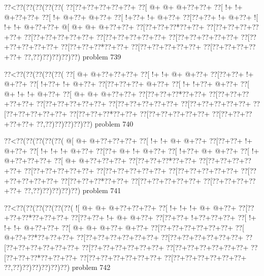 \vbox{\vbox{\goo
\0??<\0??(\0??(\0??(\0??(\0??(
\0??[\0??+\0??+\0??+\0??+\0??+
\0??[\- @+\- @+\- @+\0??+\0??+
\0??[\- !+\- !+\- @+\0??+\0??+
\0??[\- !+\- @+\0??+\- @+\0??+
\0??[\- !+\0??+\- !+\- @+\0??+
\0??[\0??+\0??+\- !+\- @+\0??+
\- ![\- !+\- !+\- @+\0??+\0??+
\- @[\- @+\- @+\- @+\0??+\0??+
\0??[\0??+\0??+\0??*\0??+\0??+
\0??[\0??+\0??+\0??+\0??+\0??+
\0??[\0??+\0??+\0??+\0??+\0??+
\0??[\0??+\0??+\0??+\0??+\0??+
\0??[\0??+\0??+\0??+\0??+\0??+
\0??[\0??+\0??+\0??+\0??+\0??+
\0??[\0??+\0??+\0??*\0??+\0??+
\0??[\0??+\0??+\0??+\0??+\0??+
\0??[\0??+\0??+\0??+\0??+\0??+
\0??,\0??)\0??)\0??)\0??)\0??)
}
\hfil problem 739\hfil\break
}

\vbox{\vbox{\goo
\0??<\0??(\0??(\0??(\0??(\0??(
\0??[\- @+\- @+\0??+\0??+\0??+
\0??[\- !+\- !+\- @+\- @+\0??+
\0??[\0??+\0??+\- !+\- @+\0??+
\0??[\- !+\0??+\- !+\- @+\0??+
\0??[\0??+\0??+\0??+\- @+\0??+
\0??[\- !+\- !+\0??+\- @+\0??+
\0??[\- @+\- !+\- !+\- @+\0??+
\0??[\- @+\- @+\- @+\0??+\0??+
\0??[\0??+\0??+\0??*\0??+\0??+
\0??[\0??+\0??+\0??+\0??+\0??+
\0??[\0??+\0??+\0??+\0??+\0??+
\0??[\0??+\0??+\0??+\0??+\0??+
\0??[\0??+\0??+\0??+\0??+\0??+
\0??[\0??+\0??+\0??+\0??+\0??+
\0??[\0??+\0??+\0??*\0??+\0??+
\0??[\0??+\0??+\0??+\0??+\0??+
\0??[\0??+\0??+\0??+\0??+\0??+
\0??,\0??)\0??)\0??)\0??)\0??)
}
\hfil problem 740\hfil\break
}

\vbox{\vbox{\goo
\0??<\0??(\0??(\0??(\0??(\0??(
\- @[\- @+\- @+\0??+\0??+\0??+
\0??[\- !+\- !+\- @+\- @+\0??+
\0??[\0??+\0??+\- !+\- @+\0??+
\0??[\- !+\- !+\- !+\- @+\0??+
\0??[\0??+\- @+\- !+\- @+\0??+
\0??[\- !+\0??+\- @+\- @+\0??+
\0??[\- !+\- @+\0??+\0??+\0??+
\0??[\- @+\- @+\0??+\0??+\0??+
\0??[\0??+\0??+\0??*\0??+\0??+
\0??[\0??+\0??+\0??+\0??+\0??+
\0??[\0??+\0??+\0??+\0??+\0??+
\0??[\0??+\0??+\0??+\0??+\0??+
\0??[\0??+\0??+\0??+\0??+\0??+
\0??[\0??+\0??+\0??+\0??+\0??+
\0??[\0??+\0??+\0??*\0??+\0??+
\0??[\0??+\0??+\0??+\0??+\0??+
\0??[\0??+\0??+\0??+\0??+\0??+
\0??,\0??)\0??)\0??)\0??)\0??)
}
\hfil problem 741\hfil\break
}

\vbox{\vbox{\goo
\0??<\0??(\0??(\0??(\0??(\0??(\0??(
\- ![\- @+\- @+\- @+\0??+\0??+\0??+
\0??[\- !+\- !+\- !+\- @+\- @+\0??+
\0??[\0??+\0??+\0??*\0??+\0??+\0??+
\0??[\0??+\0??+\- !+\- @+\- @+\0??+
\0??[\0??+\0??+\- !+\0??+\0??+\0??+
\0??[\- !+\- !+\- !+\- @+\0??+\0??+
\0??[\- @+\- @+\- @+\0??+\- @+\0??+
\0??[\0??+\0??+\0??+\0??+\0??+\0??+
\0??[\- @+\0??+\0??*\0??+\0??+\0??+
\0??[\0??+\0??+\0??+\0??+\0??+\0??+
\0??[\0??+\0??+\0??+\0??+\0??+\0??+
\0??[\0??+\0??+\0??+\0??+\0??+\0??+
\0??[\0??+\0??+\0??+\0??+\0??+\0??+
\0??[\0??+\0??+\0??+\0??+\0??+\0??+
\0??[\0??+\0??+\0??*\0??+\0??+\0??+
\0??[\0??+\0??+\0??+\0??+\0??+\0??+
\0??[\0??+\0??+\0??+\0??+\0??+\0??+
\0??,\0??)\0??)\0??)\0??)\0??)\0??)
}
\hfil problem 742\hfil\break
}

